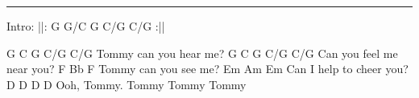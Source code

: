 \noindent\rule{\columnwidth}{1pt}

\begin{lstsong}
Intro:
||: G    G/C   G     C/G C/G :||

G             C    G    C/G C/G
Tommy can you hear me?
G               C    G    C/G C/G
Can you feel me near you?
F             Bb  F
Tommy can you see me?
Em            Am    Em
Can I help to cheer you?
     D      D     D     D
Ooh, Tommy. Tommy Tommy Tommy
\end{lstsong}
\newpage

\begin{comment}

Intro and main riff- A-A D A  A-A-A-A-A-A-A

A         A   D    A    A-A-A-A-A-A-A
Tommy can you hear me? 

A            A  D    A    A-A-A-A-A-A-A
Can you feel me near you? 

Then goes lower

G         G   C   G   G-G-G-G-G-G-G
Tommy can you see me?

G          G  C     G    G-G-G-G-G-G
Can I help to chear you?

Strum G
Oh Tommy Tommy Tommy Tommy 

Repeat everything except intro
Tommy...Tommy...Tommy...Tommy...Tommy...

###





G C G *

G              C   G  C G
Tommy, can you see me?
G             C     G   C G
Can I help to cheer you?
F              Bb   F  Bb F
Tommy, can you hear me?
Em              Am   Em
Can you feel me near you?
      D      D      D      D
Oooh, Tommy, Tommy, Tommy, Tommy.

G              C    G  C G
Tommy, can you hear me?
G               C    G   C G
Can you feel me near you?
F              Bb  F   Bb F
Tommy, can you see me?
Em            Am    Em
Can I help to cheer you?
      D      D      D
Oooh, Tommy, Tommy, Tommy, 
D      D      D
Tommy, Tommy, Tommy.
\end{comment}

